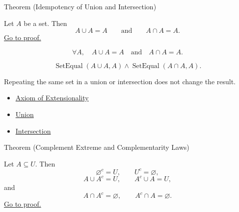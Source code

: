 \begin{theorembox}{Theorem (Idempotency of Union and Intersection)}
\begin{theorem}\label{thm:idempotency}
Let $A$ be a set. Then
\[
A\cup A=A
\qquad\text{and}\qquad
A\cap A=A.
\]
\hyperref[prf:idempotency]{Go to proof.}
\end{theorem}
\end{theorembox}

\begin{remark*}
\[
  \forall A,\quad A\cup A=A \quad\text{and}\quad A\cap A=A.
\]
\end{remark*}

\begin{remark*}
\[
  \operatorname{SetEqual}(A\cup A,A)
  \wedge
  \operatorname{SetEqual}(A\cap A,A).
\]
\end{remark*}

\begin{remark*}[Interpretation]
Repeating the same set in a union or intersection does not change the result.
\end{remark*}


\begin{dependencies}
\begin{itemize}
  \item \hyperref[ax:extensionality]{Axiom of Extensionality}
  \item \hyperref[def:union]{Union}
  \item \hyperref[def:intersection]{Intersection}
\end{itemize}
\end{dependencies}

\begin{theorembox}{Theorem (Complement Extreme and Complementarity Laws)}
\begin{theorem}\label{thm:complement-laws}
Let $A\subseteq U$. Then
\[
\varnothing^c=U,
\qquad
U^c=\varnothing,
\]
\[
A\cup A^c=U,
\qquad
A^c\cup A=U,
\]
and
\[
A\cap A^c=\varnothing,
\qquad
A^c\cap A=\varnothing.
\]
\hyperref[prf:complement-laws]{Go to proof.}
\end{theorem}
\end{theorembox}

